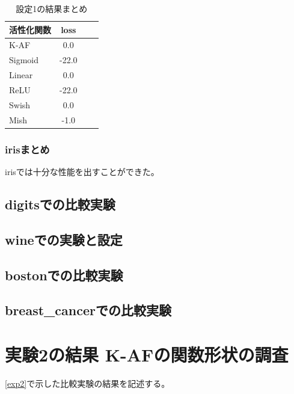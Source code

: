 \begin{table}[htbp]
    \begin{center}
        \caption{設定1の結果まとめ}
        \vspace{5mm} 
        \begin{tabular}{l*{2}{c}r}
            活性化関数              & loss \\
            \hline
            K-AF            & 0.0 \\
            Sigmoid            & -22.0 \\
            Linear            & 0.0 \\
            ReLU        & -22.0 \\
            Swish           & 0.0 \\
            Mish           & -1.0 \\
    
        \end{tabular}
    \end{center}
\end{table}


\subsubsection{irisまとめ}

irisでは十分な性能を出すことができた。


\subsection{digitsでの比較実験}
\label{ev:digitsでの比較実験}

\subsection{wineでの実験と設定}
\label{ev:wineでの実験と設定}

\subsection{bostonでの比較実験}
\label{ev:bostonでの比較実験}

\subsection{breast\_cancerでの比較実験}
\label{ev:breastcancer}

\section{実験2の結果 K-AFの関数形状の調査}
\label{evo2}
\ref{exp2}で示した比較実験の結果を記述する。


